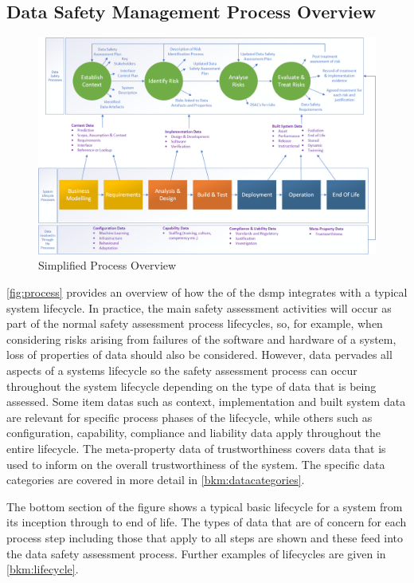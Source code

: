\subsection{Data Safety Management Process Overview}
\begin{figure}[hb]
\centering
\includegraphics[angle=90,scale=0.65]{images/process_diagram}
\caption{Simplified Process Overview}
\label{fig:process}
\end{figure}

\autoref{fig:process} provides an overview of how the of the \gls{dsmp}
integrates with a typical system lifecycle. In practice, the main \gls{safety assessment} activities will
occur as part of the normal safety assessment process lifecycles, so, for example, when considering risks arising
from failures of the software and hardware of a system, loss of properties of data should also be
considered. However, data pervades all aspects of a systems lifecycle so the \gls{safety assessment}
process can occur throughout the system lifecycle depending on the type of data that is being
assessed. Some \glspl{item data} such as context, implementation and built system data are relevant for
specific process phases of the lifecycle, while others such as configuration, capability, compliance and
liability data apply throughout the entire lifecycle. The meta-property data of trustworthiness
covers data that is used to inform on the overall trustworthiness of the system. The specific data
categories are covered in more detail in \autoref{bkm:datacategories}.

The bottom section of the figure shows a typical basic lifecycle for a system from its inception
through to end of life. The types of data that are of concern for each process step including those
that apply to all steps are shown and these feed into the data \gls{safety assessment} process. Further
examples of lifecycles are given in \autoref{bkm:lifecycle}.
\cbend

